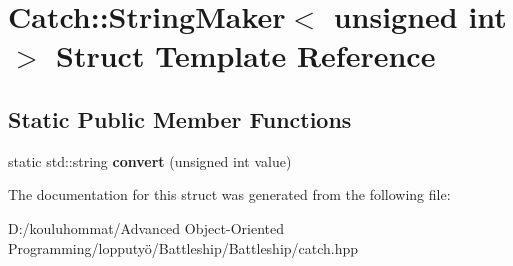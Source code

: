 \hypertarget{struct_catch_1_1_string_maker_3_01unsigned_01int_01_4}{}\section{Catch\+:\+:String\+Maker$<$ unsigned int $>$ Struct Template Reference}
\label{struct_catch_1_1_string_maker_3_01unsigned_01int_01_4}
\subsection*{Static Public Member Functions}
\begin{DoxyCompactItemize}
\item 
\mbox{\label{struct_catch_1_1_string_maker_3_01unsigned_01int_01_4_aa0ec816ef8a65664b0524d55d08e2fd9}} 
static std\+::string {\bfseries convert} (unsigned int value)
\end{DoxyCompactItemize}


The documentation for this struct was generated from the following file\+:\begin{DoxyCompactItemize}
\item 
D\+:/kouluhommat/\+Advanced Object-\/\+Oriented Programming/lopputyö/\+Battleship/\+Battleship/catch.\+hpp\end{DoxyCompactItemize}
